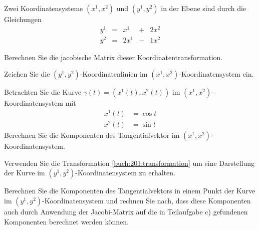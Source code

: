 Zwei Koordinatensysteme $(x^1,x^2)$ und $(y^1,y^2)$ in der Ebene sind
durch die Gleichungen
\begin{equation}
\renewcommand\arraycolsep{2pt}
\begin{array}{rcrcr}
y^1 &=&  x^1 &+& 2x^2 \\
y^2 &=& 2x^1 &-& 1x^2
\end{array}
\label{buch:201:transformation}
\end{equation}
\begin{teilaufgaben}
\item
Berechnen Sie die jacobische Matrix dieser Koordinatentransformation.
\item
Zeichen Sie die $(y^1,y^2)$-Koordinatenlinien im
$(x^1,x^2)$-Koordinatensystem ein.
\item
Betrachten Sie die Kurve $\gamma(t) = (x^1(t),x^2(t))$ im
$(x^1,x^2)$-Koordinatensystem mit
\begin{align*}
x^1(t) &= \cos t \\
x^2(t) &= \sin t
\end{align*}
Berechnen Sie die Komponenten des Tangentialvektor im
$(x^1,x^2)$-Koordinaten\-sys\-tem.
\item
Verwenden Sie die Transformation \eqref{buch:201:transformation}
um eine Darstellung der Kurve im $(y^1,y^2)$-Koordinatensystem zu erhalten.
\item
Berechnen Sie die Komponenten des Tangentialvektors in einem
Punkt der Kurve im $(y^1,y^2)$-Koordinatensystem und rechnen Sie
nach, dass diese Komponenten auch durch Anwendung der Jacobi-Matrix
auf die in Teilaufgabe c) gefundenen Komponenten berechnet werden
können.
\end{teilaufgaben}

